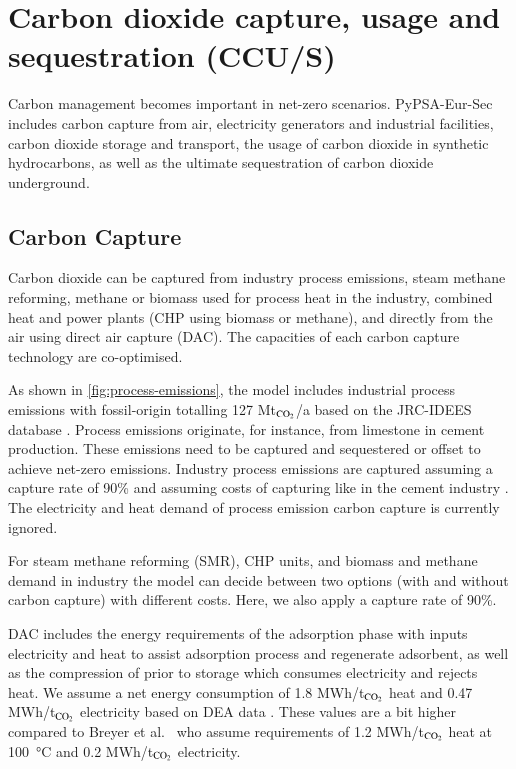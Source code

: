 \section{Carbon dioxide capture, usage and sequestration (CCU/S)}
\label{sec:si:carbon-management}

Carbon management becomes important in net-zero scenarios.
PyPSA-Eur-Sec includes carbon capture from air, electricity generators and
industrial facilities, carbon dioxide storage and transport, the usage of carbon
dioxide in synthetic hydrocarbons, as well as the ultimate sequestration of
carbon dioxide underground.

\subsection{Carbon Capture}

Carbon dioxide can be captured from industry process emissions, steam methane
reforming, methane or biomass used for process heat in the industry, combined
heat and power plants (CHP using biomass or methane), and directly from the air
using direct air capture (DAC). The capacities of each carbon capture technology
are co-optimised.

As shown in \cref{fig:process-emissions}, the model includes industrial process
emissions with fossil-origin totalling 127 Mt$_{\ce{CO2}}$/a based on
the JRC-IDEES database . Process emissions originate, for instance,
from limestone in cement production. These emissions need to be captured and
sequestered or offset to achieve net-zero emissions. Industry process emissions
are captured assuming a capture rate of 90\% and assuming costs of \co capturing
like in the cement industry . The electricity and heat demand of process
emission carbon capture is currently ignored.

For steam methane reforming (SMR), CHP units, and biomass and methane demand in
industry the model can decide between two options (with and without carbon
capture) with different costs. Here, we also apply a capture rate of 90\%.

DAC includes the energy requirements of the adsorption phase with inputs
electricity and heat to assist adsorption process and regenerate adsorbent, as
well as the compression of \co prior to storage which consumes electricity and
rejects heat. We assume a net energy consumption of 1.8 MWh/t$_{\ce{CO2}}$ heat and 0.47
MWh/t$_{\ce{CO2}}$ electricity based on DEA data . These values are a bit higher
compared to Breyer et al.~ who assume
requirements of 1.2 MWh/t$_{\ce{CO2}}$ heat at \SI{100}{\celsius} and 0.2 MWh\el/t$_{\ce{CO2}}$
electricity.

